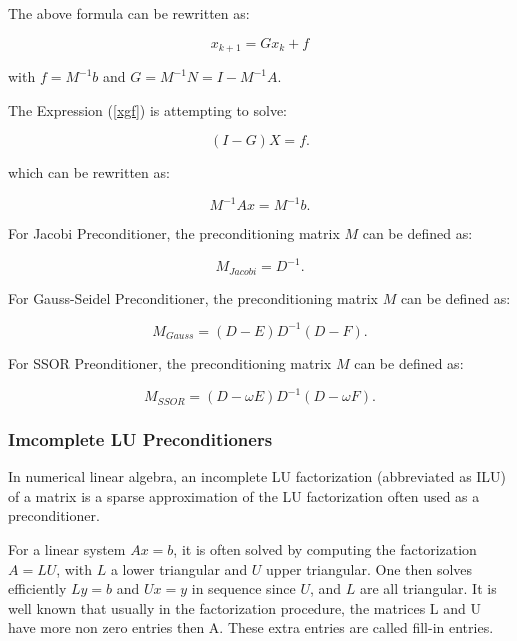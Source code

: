The above formula can be rewritten as:

\begin{equation}
\label{xgf}
x_{k+1}=Gx_k+f
\end{equation}

with $f=M^{-1}b$ and $G=M^{-1}N=I-M^{-1}A.$

The Expression (\ref{xgf}) is attempting to solve:

\begin{equation}
(I-G)X=f.
\end{equation}


which can be rewritten as:

\begin{equation}
M^{-1}Ax=M^{-1}b.
\end{equation}

For Jacobi Preconditioner, the preconditioning matrix $M$ can be defined as:

\begin{equation}
M_{Jacobi} = D^{-1}.
\end{equation}

For Gauss-Seidel Preconditioner, the preconditioning matrix $M$ can be defined as:

\begin{equation}
M_{Gauss} = (D- E)D^{-1}(D- F).
\end{equation}

For SSOR Preonditioner, the preconditioning matrix $M$ can be defined as:

\begin{equation}
M_{SSOR} =  (D-\omega E)D^{-1}(D-\omega F).
\end{equation}

\subsubsection{Imcomplete LU Preconditioners}

In numerical linear algebra, an incomplete LU factorization (abbreviated as ILU) of a matrix is a sparse approximation of the LU factorization often used as a preconditioner.

For a linear system $Ax=b$, it is often solved by computing the factorization $A=LU$, with $L$ a lower triangular and $U$ upper triangular. One then solves efficiently $Ly=b$ and $Ux=y$ in sequence since $U$, and $L$ are all triangular.  It is well known that usually in the factorization procedure, the matrices L and U have more non zero entries then A. These extra entries are called fill-in entries.

